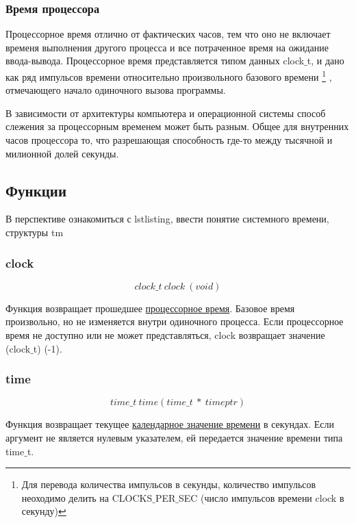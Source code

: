 \documentclass{article}
\begin{document}
			\subsubsection{Время процессора}
				Процессорное время отлично от фактических часов, тем что оно не включает временя выполнения другого процесса и 					все потраченное время на ожидание ввода-вывода. Процессорное время представляется типом данных clock$\_$t, и дано 					как ряд импульсов времени относительно произвольного базового времени
			\footnote{Для перевода количества импульсов в секунды, количество импульсов неоходимо делить на CLOCKS$\_$PER$\_$SEC 				(число	импульсов времени clock в секунду)}
			, отмечающего начало одиночного вызова программы. 
				
				В зависимости от архитектуры компьютера и операционной системы способ слежения за процессорным временем может 					быть разным. Общее для внутренних часов процессора то, что разрешающая способность где-то между тысячной и милионной 				долей секунды.
		
		\subsection{Функции}
		В перспективе ознакомиться с lstlisting, ввести понятие системного времени, структуры tm
			\subsubsection*{clock}
				$$clock\_t~clock~(void)$$
				
				Функция возвращает прошедшее \underline{процессорное время}. Базовое время произвольно, но не изменяется внутри 				одиночного процесса. Если процессорное время не доступно или не может представляться, clock возвращает значение 					(clock$\_$t) (-1).
			\subsubsection*{time}
				$$time\_t~time(time\_t~ *~ timeptr)$$
				
				Функция возвращает текущее \underline{календарное значение времени} в секундах. Если аргумент не является нулевым 			указателем, ей передается значение времени типа time$\_$t.
\end{document}

